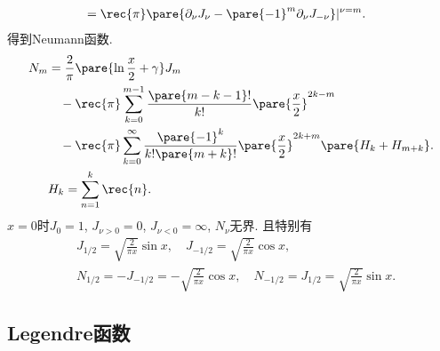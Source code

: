 \documentclass[hidelinks]{ctexart}
\begin{document}
\begin{ex}
\begin{align*}
        &= \rec{\pi} \pare{\partial_\nu J_\nu - \pare{-1}^m \partial_\nu J_{-\nu}}\vert^{\nu = m}.
    \end{align*}
    得到Neumann函数.
    \begin{align*}
        N_m &= \frac{2}{\pi}\pare{\ln \frac{x}{2} + \gamma} J_m \\
        &\phantom{=\,} - \rec{\pi}\sum_{k=0}^{m-1}\frac{\pare{m-k-1}!}{k!}\pare{\frac{x}{2}}^{2k-m} \\
        &\phantom{=\,} - \rec{\pi}\sum_{k=0}^{\infty} \frac{\pare{-1}^k}{k!\pare{m+k}!}\pare{\frac{x}{2}}^{2k+m}\pare{H_k + H_{m+k}}.\\
        & H_k = \sum_{n=1}^k \rec{n}.
    \end{align*}
    $x=0$时$J_0 = 1$, $J_{\nu>0} = 0$, $J_{\nu<0} = \infty$, $N_\nu$无界. 且特别有
    \begin{align*}
        & J_{1/2} = \sqrt{\frac{2}{\pi x}}\sin x,\quad J_{-1/2} = \sqrt{\frac{2}{\pi x}} \cos x, \\
        & N_{1/2} = -J_{-1/2} = -\sqrt{\frac{2}{\pi x}}\cos x,\quad N_{-1/2} = J_{1/2} = \sqrt{\frac{2}{\pi x}}\sin x.
    \end{align*}
\end{ex}


\subsection{Legendre函数} %
\label{sub:legendre函数}
\end{document}
